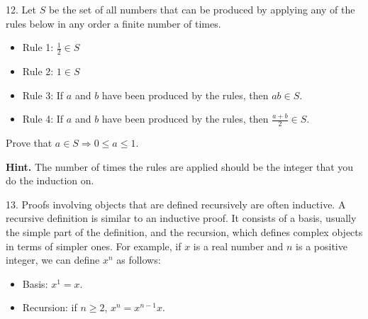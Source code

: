 \documentclass[10pt,]{book}
\theoremstyle{plain}
\theoremstyle{definition}
\theoremstyle{definition}
\theoremstyle{definition}
\theoremstyle{definition}
\begin{document}
\begin{exercisegroup}
%
\item[12.]\hypertarget{exercise-49}{}Let \(S\) be the set of all numbers that can be produced by applying any of the rules below in any order a finite number of times.
\leavevmode%
\begin{itemize}[label=\textbullet]
\item{}Rule 1: \(\frac{1}{2} \in  S\)%
\item{}Rule 2: \(1 \in  S\)%
\item{}Rule 3: If \(a\) and \(b\) have been produced by the rules, then \(a b \in  S\).%
\item{}Rule 4: If \(a\) and \(b\) have been produced by the rules, then \(\frac{a+b}{2}\in S\).%
\end{itemize}

Prove  that \(a\in S \Rightarrow  0 \le a \leq  1\).%
\par\smallskip
\par\smallskip
\noindent\textbf{Hint.}\hypertarget{hint-1}{}\quad
The number of times the rules are applied should be the integer that you do the induction on.%
\item[13.]\hypertarget{exercise-50}{}Proofs involving objects that are defined recursively are often inductive.  A recursive definition is similar to an inductive proof. It consists of a basis, usually the simple part of the definition, and the recursion, which defines complex objects in terms of simpler ones. For example, if \(x\) is a real number and \(n\) is a positive integer, we can
define \(x^n\) as follows:

\leavevmode%
\begin{itemize}[label=\textbullet]
\item{}Basis: \(x^1=x\).%
\item{}Recursion: if \(n \geq  2\), \(x^n= x^{n-1}x\).%
\end{itemize}


\end{exercisegroup}
\end{document}

